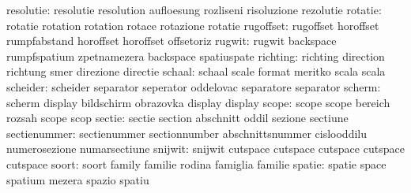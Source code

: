                 resolutie: resolutie                 resolution
                           aufloesung                rozliseni
                           risoluzione               rezolutie
                  rotatie: rotatie                   rotation
                           rotation                  rotace
                           rotazione                 rotatie
                rugoffset: rugoffset                 horoffset
                           rumpfabstand              horoffset
                           horoffset                 offsetoriz %
                   rugwit: rugwit                    backspace
                           rumpfspatium              zpetnamezera
                           backspace                 spatiuspate %
                 richting: richting                  direction
                           richtung                  smer
                           direzione                 directie
                   schaal: schaal                    scale
                           format                    meritko
                           scala                     scala
                 scheider: scheider                  separator
                           seperator                 oddelovac
                           separatore                separator
                   scherm: scherm                    display
                           bildschirm                obrazovka
                           display                   display %
                    scope: scope                     scope
                           bereich                   rozsah
                           scope                     scop %
                   sectie: sectie                    section
                           abschnitt                 oddil
                           sezione                   sectiune
             sectienummer: sectienummer              sectionnumber
                           abschnittsnummer          cislooddilu
                           numerosezione             numarsectiune
                  snijwit: snijwit                   cutspace
                           cutspace                  cutspace
                           cutspace                  cutspace %
                    soort: soort                     family
                           familie                   rodina
                           famiglia                  familie
                   spatie: spatie                    space
                           spatium                   mezera
                           spazio                    spatiu

